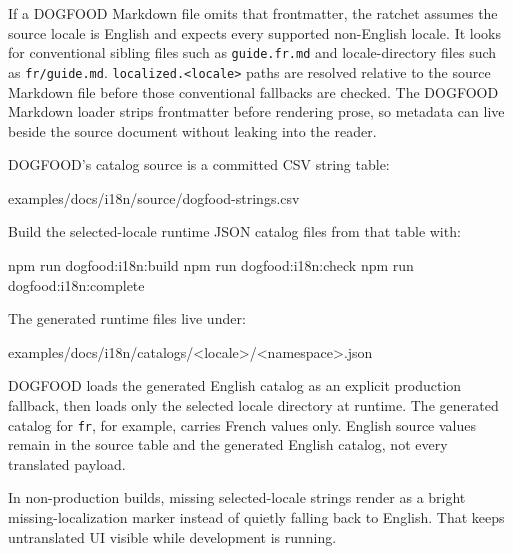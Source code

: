 If a DOGFOOD Markdown file omits that frontmatter, the ratchet assumes the source locale is English and expects every supported non-English locale. It looks for conventional sibling files such as \texttt{g\allowbreak{}u\allowbreak{}i\allowbreak{}d\allowbreak{}e\allowbreak{}.\allowbreak{}f\allowbreak{}r\allowbreak{}.\allowbreak{}m\allowbreak{}d} and locale-directory files such as \texttt{f\allowbreak{}r\allowbreak{}/\allowbreak{}g\allowbreak{}u\allowbreak{}i\allowbreak{}d\allowbreak{}e\allowbreak{}.\allowbreak{}m\allowbreak{}d}. \texttt{l\allowbreak{}o\allowbreak{}c\allowbreak{}a\allowbreak{}l\allowbreak{}i\allowbreak{}z\allowbreak{}e\allowbreak{}d\allowbreak{}.\allowbreak{}<\allowbreak{}l\allowbreak{}o\allowbreak{}c\allowbreak{}a\allowbreak{}l\allowbreak{}e\allowbreak{}>} paths are resolved relative to the source Markdown file before those conventional fallbacks are checked. The DOGFOOD Markdown loader strips frontmatter before rendering prose, so metadata can live beside the source document without leaking into the reader.

DOGFOOD's catalog source is a committed CSV string table:

\begin{CodeBlock}
examples/docs/i18n/source/dogfood-strings.csv
\end{CodeBlock}

Build the selected-locale runtime JSON catalog files from that table with:

\begin{CodeBlock}
npm run dogfood:i18n:build
npm run dogfood:i18n:check
npm run dogfood:i18n:complete
\end{CodeBlock}

The generated runtime files live under:

\begin{CodeBlock}
examples/docs/i18n/catalogs/<locale>/<namespace>.json
\end{CodeBlock}

DOGFOOD loads the generated English catalog as an explicit production fallback, then loads only the selected locale directory at runtime. The generated catalog for \texttt{f\allowbreak{}r}, for example, carries French values only. English source values remain in the source table and the generated English catalog, not every translated payload.

In non-production builds, missing selected-locale strings render as a bright missing-localization marker instead of quietly falling back to English. That keeps untranslated UI visible while development is running.

